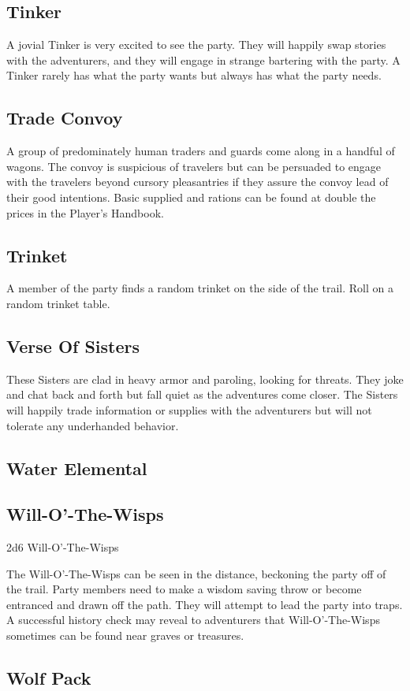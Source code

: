 \subsection{Tinker}

A jovial Tinker is very excited to see the party.
They will happily swap stories with the adventurers, and they will engage in strange bartering with the party.
A Tinker rarely has what the party wants but always has what the party needs.

\subsection{Trade Convoy}

A group of predominately human traders and guards come along in a handful of wagons.
The convoy is suspicious of travelers but can be persuaded to engage with the travelers beyond cursory pleasantries if they assure the convoy lead of their good intentions.
Basic supplied and rations can be found at double the prices in the Player's Handbook.

\subsection{Trinket}

A member of the party finds a random trinket on the side of the trail.
Roll on a random trinket table.

\subsection{Verse Of Sisters}

These Sisters are clad in heavy armor and paroling, looking for threats.
They joke and chat back and forth but fall quiet as the adventures come closer.
The Sisters will happily trade information or supplies with the adventurers but will not tolerate any underhanded behavior.

\subsection{Water Elemental}

\subsection{Will-O'-The-Wisps}

2d6 Will-O'-The-Wisps

The Will-O'-The-Wisps can be seen in the distance, beckoning the party off of the trail.
Party members need to make a wisdom saving throw or become entranced and drawn off the path.
They will attempt to lead the party into traps.
A successful history check may reveal to adventurers that Will-O'-The-Wisps sometimes can be found near graves or treasures.

\subsection{Wolf Pack}
